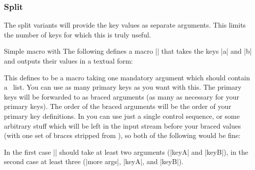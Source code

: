 \subsubsection{Split\label{sec:c:split}}

The split variants will provide the key values as separate arguments. This
limits the number of keys for which this is truly useful.

\begin{example}{Simple macro with }
  The following defines a macro |\foo| that takes the keys |a| and |b|
  and outputs their values in a textual form:
  \begin{enverb}
    \ekvcSplit{}
    \foo{}
  \end{enverb}
\end{example}

\begin{function}{\ekvcSplitAndForward}
  \begin{syntax}
  \end{syntax}
  This defines  to be a macro taking one mandatory argument which
  should contain a \kv\ list. You can use as many primary keys as you want with
  this. The primary keys will be forwarded to  as braced arguments
  (as many as necessary for your primary keys). The order of the braced
  arguments will be the order of your primary key definitions. In 
  you can use just a single control sequence, or some arbitrary stuff which will
  be left in the input stream before your braced values (with one set of braces
  stripped from ), so both of the following would be fine:
  \begin{enverb}[no-tcb]
    \ekvcSplitAndForward\foo{}
    \ekvcSplitAndForward{}
  \end{enverb}
\end{function}
\noindent
In the first case |\foo@aux| should take at least two arguments (|keyA| and
|keyB|), in the second case at least three (|more args|, |keyA|, and |keyB|).


